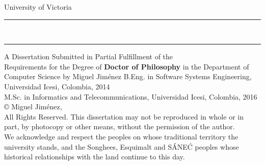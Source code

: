 \thispagestyle{empty}

\begingroup%
	\begin{center}
		{\huge University of Victoria}
		\vfill
		\hrule
		\vspace{0.8cm}
		{\Huge\bfseries \thesistitle \\}
		\vspace{2cm}
		\hrule
		\vfill
		{A Dissertation Submitted in Partial Fulfillment of the\\Requirements for the Degree of \mylinebreak}
		{\Large\bfseries Doctor of Philosophy \mylinebreak}
		in the Department of Computer Science \mylinebreak
		{by \mylinebreak}
		{\Large Miguel Jim\'{e}nez \mylinebreak}
		{B.Eng. in Software Systems Engineering, Universidad Icesi, Colombia, 2014 \\
			M.Sc. in Informatics and Telecommunications, Universidad Icesi, Colombia, 2016 \\}
		\vfill
		\copyright{} Miguel Jim\'{e}nez, \the\year{}\\[1em]
		{\footnotesize All Rights Reserved. This dissertation may not be reproduced in whole or in part, by photocopy or other means, without the permission of the author.\\[0.5em]}
		{\footnotesize We acknowledge and respect the \lekwungen{} peoples on whose traditional territory the university stands, and the Songhees, Esquimalt and S\'{A}NE\'{C} peoples whose historical relationships with the land continue to this day.}
	\end{center}
\endgroup

\clearpage
